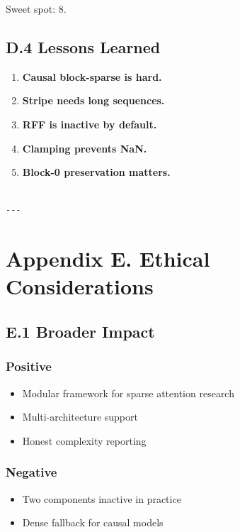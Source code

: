 Sweet spot: 8.

\subsection{D.4 Lessons Learned}

\begin{enumerate}
\item \textbf{Causal block-sparse is hard.}
\item \textbf{Stripe needs long sequences.}
\item \textbf{RFF is inactive by default.}
\item \textbf{Clamping prevents NaN.}
\item \textbf{Block-0 preservation matters.}
\end{enumerate}
\begin{lstlisting}

---
\end{lstlisting}

\section{Appendix E. Ethical Considerations}

\subsection{E.1 Broader Impact}

\subsubsection{Positive}
\begin{itemize}
\item Modular framework for sparse attention research
\item Multi-architecture support
\item Honest complexity reporting

\end{itemize}
\subsubsection{Negative}
\begin{itemize}
\item Two components inactive in practice
\item Dense fallback for causal models

\end{itemize}

